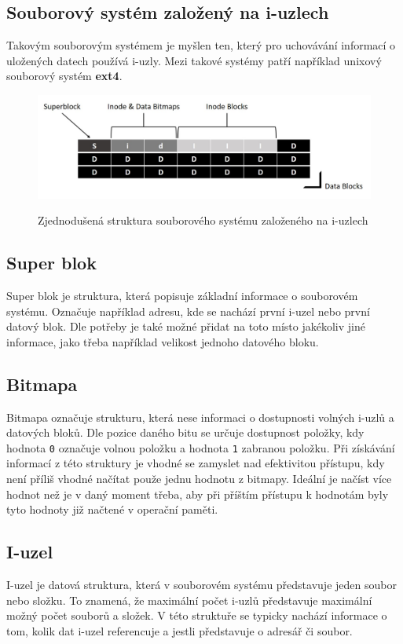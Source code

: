 \documentclass[12pt, a4paper]{article}
\begin{document}
    
    \subsection{Souborový systém založený na i-uzlech}
    Takovým souborovým systémem je myšlen ten, který pro uchovávání informací o uložených datech používá i-uzly. Mezi takové systémy patří například unixový souborový systém \textbf{ext4}.
    
    \begin{figure}[!ht]
\centering
{\includegraphics[width=14cm]{img/fs-structure.jpg}}
\caption{Zjednodušená struktura souborového systému založeného na i-uzlech}
\label{fig:fs-structure}
\end{figure}
        
    
    \subsection{Super blok}
 	Super blok je struktura, která popisuje základní informace o souborovém systému.  Označuje například adresu, kde se nachází první i-uzel nebo první datový blok. Dle potřeby je také možné přidat na toto místo jakékoliv jiné informace, jako třeba například velikost jednoho datového bloku.
 	
 	\subsection{Bitmapa}
 	Bitmapa označuje strukturu, která nese informaci o dostupnosti volných i-uzlů a datových bloků. Dle pozice daného bitu se určuje dostupnost položky, kdy hodnota \texttt{0} označuje volnou položku a hodnota \texttt{1} zabranou položku. Při získávání informací z této struktury je vhodné se zamyslet nad efektivitou přístupu, kdy není příliš vhodné načítat použe jednu hodnotu z bitmapy. Ideální je načíst více hodnot než je v daný moment třeba, aby při příštím přístupu k hodnotám byly tyto hodnoty již načtené v operační paměti.
    
    \subsection{I-uzel}
    I-uzel je datová struktura, která v souborovém systému představuje jeden soubor nebo složku. To znamená, že maximální počet i-uzlů představuje maximální možný počet souborů a složek. V této struktuře se typicky nachází informace o tom, kolik dat i-uzel referencuje a jestli představuje o adresář či soubor. 
    
\end{document}
